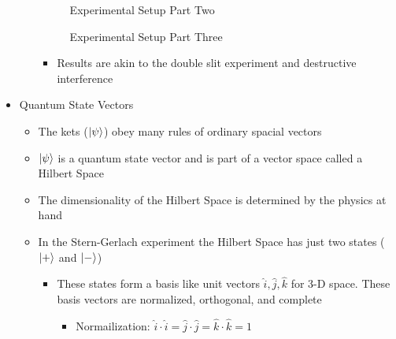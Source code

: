 \begin{itemize}
\begin{itemize}
        \begin{figure}[H]
          \centering
          
          \caption{Experimental Setup Part Two}
          \label{fig:6}
        \end{figure}

        \begin{figure}[H]
          \centering
          
          \caption{Experimental Setup Part Three}
          \label{fig:7}
        \end{figure}

        \begin{itemize}

          \item Results are akin to the double slit experiment and destructive interference

        \end{itemize}

    \end{itemize}

  \item Quantum State Vectors

    \begin{itemize}

      \item The kets ($\ket{\psi}$) obey many rules of ordinary spacial vectors

      \item $\ket{\psi}$ is a quantum state vector and is part of a vector space called a Hilbert Space

      \item The dimensionality of the Hilbert Space is determined by the physics at hand

      \item In the Stern-Gerlach experiment the Hilbert Space has just two states ($\ket{+}$ and $\ket{-}$)

        \begin{itemize}

          \item These states form a basis like unit vectors $\hat{i},\hat{j},\hat{k}$ for 3-D space. These basis vectors are normalized, orthogonal, and complete
            
            \begin{itemize}

              \item Normailization: $\hat{i}\cdot\hat{i}=\hat{j}\cdot\hat{j}=\hat{k}\cdot\hat{k}=1$


\end{itemize}
\end{itemize}
\end{itemize}
\end{itemize}

